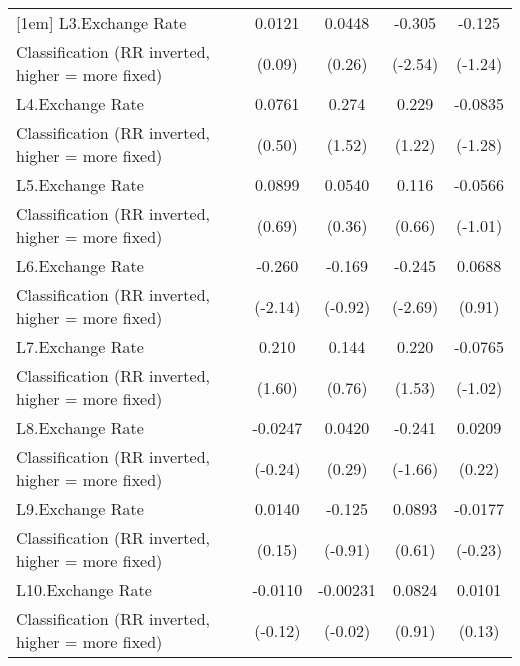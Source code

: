 {\begin{tabular}{l*{4}{c}}
[1em]
L3.Exchange Rate    &      0.0121         &      0.0448         &      -0.305\sym{*}  &      -0.125         \\
Classification (RR inverted, higher = more fixed)&      (0.09)         &      (0.26)         &     (-2.54)         &     (-1.24)         \\
[1em]
L4.Exchange Rate    &      0.0761         &       0.274         &       0.229         &     -0.0835         \\
Classification (RR inverted, higher = more fixed)&      (0.50)         &      (1.52)         &      (1.22)         &     (-1.28)         \\
[1em]
L5.Exchange Rate    &      0.0899         &      0.0540         &       0.116         &     -0.0566         \\
Classification (RR inverted, higher = more fixed)&      (0.69)         &      (0.36)         &      (0.66)         &     (-1.01)         \\
[1em]
L6.Exchange Rate    &      -0.260\sym{*}  &      -0.169         &      -0.245\sym{**} &      0.0688         \\
Classification (RR inverted, higher = more fixed)&     (-2.14)         &     (-0.92)         &     (-2.69)         &      (0.91)         \\
[1em]
L7.Exchange Rate    &       0.210         &       0.144         &       0.220         &     -0.0765         \\
Classification (RR inverted, higher = more fixed)&      (1.60)         &      (0.76)         &      (1.53)         &     (-1.02)         \\
[1em]
L8.Exchange Rate    &     -0.0247         &      0.0420         &      -0.241         &      0.0209         \\
Classification (RR inverted, higher = more fixed)&     (-0.24)         &      (0.29)         &     (-1.66)         &      (0.22)         \\
[1em]
L9.Exchange Rate    &      0.0140         &      -0.125         &      0.0893         &     -0.0177         \\
Classification (RR inverted, higher = more fixed)&      (0.15)         &     (-0.91)         &      (0.61)         &     (-0.23)         \\
[1em]
L10.Exchange Rate   &     -0.0110         &    -0.00231         &      0.0824         &      0.0101         \\
Classification (RR inverted, higher = more fixed)&     (-0.12)         &     (-0.02)         &      (0.91)         &      (0.13)         \\

\end{tabular}}
